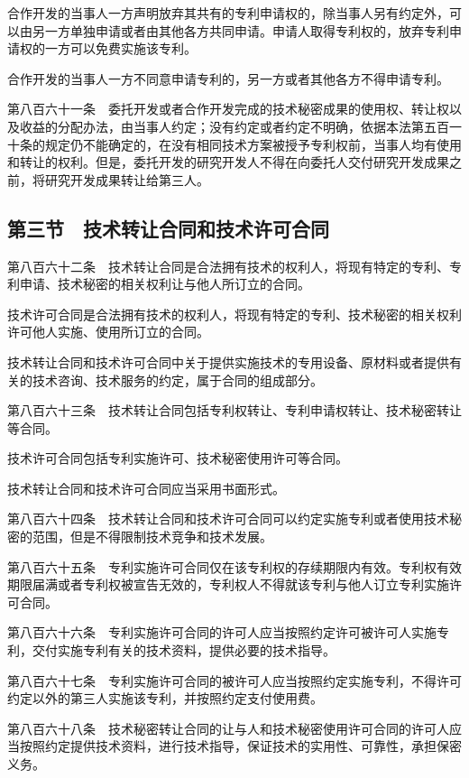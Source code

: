 \documentclass[UTF8,12pt,a4paper]{ctexbook}
\begin{document}
合作开发的当事人一方声明放弃其共有的专利申请权的，除当事人另有约定外，可以由另一方单独申请或者由其他各方共同申请。申请人取得专利权的，放弃专利申请权的一方可以免费实施该专利。

合作开发的当事人一方不同意申请专利的，另一方或者其他各方不得申请专利。

第八百六十一条　委托开发或者合作开发完成的技术秘密成果的使用权、转让权以及收益的分配办法，由当事人约定；没有约定或者约定不明确，依据本法第五百一十条的规定仍不能确定的，在没有相同技术方案被授予专利权前，当事人均有使用和转让的权利。但是，委托开发的研究开发人不得在向委托人交付研究开发成果之前，将研究开发成果转让给第三人。

\subsection*{第三节　技术转让合同和技术许可合同}

第八百六十二条　技术转让合同是合法拥有技术的权利人，将现有特定的专利、专利申请、技术秘密的相关权利让与他人所订立的合同。

技术许可合同是合法拥有技术的权利人，将现有特定的专利、技术秘密的相关权利许可他人实施、使用所订立的合同。

技术转让合同和技术许可合同中关于提供实施技术的专用设备、原材料或者提供有关的技术咨询、技术服务的约定，属于合同的组成部分。

第八百六十三条　技术转让合同包括专利权转让、专利申请权转让、技术秘密转让等合同。

技术许可合同包括专利实施许可、技术秘密使用许可等合同。

技术转让合同和技术许可合同应当采用书面形式。

第八百六十四条　技术转让合同和技术许可合同可以约定实施专利或者使用技术秘密的范围，但是不得限制技术竞争和技术发展。

第八百六十五条　专利实施许可合同仅在该专利权的存续期限内有效。专利权有效期限届满或者专利权被宣告无效的，专利权人不得就该专利与他人订立专利实施许可合同。

第八百六十六条　专利实施许可合同的许可人应当按照约定许可被许可人实施专利，交付实施专利有关的技术资料，提供必要的技术指导。

第八百六十七条　专利实施许可合同的被许可人应当按照约定实施专利，不得许可约定以外的第三人实施该专利，并按照约定支付使用费。

第八百六十八条　技术秘密转让合同的让与人和技术秘密使用许可合同的许可人应当按照约定提供技术资料，进行技术指导，保证技术的实用性、可靠性，承担保密义务。
\end{document}
